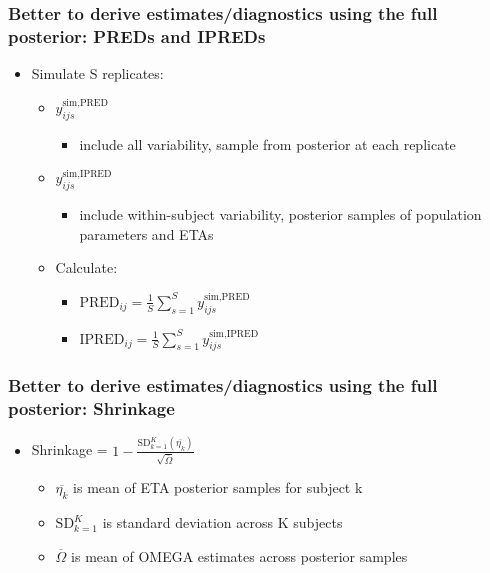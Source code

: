 \documentclass{beamer}
\begin{document}
\begin{frame}
  \frametitle{Better to derive estimates/diagnostics using the full posterior: PREDs and IPREDs}

\begin{itemize}
  \item<1-> Simulate S replicates:
        \begin{itemize}
          \item<2-> $y_{ijs}^{\text{sim,PRED}}$
                \begin{itemize}
                  \item include all variability, sample from posterior at each replicate
                \end{itemize}
          \item<3-> $y_{ijs}^{\text{sim,IPRED}}$
                \begin{itemize}
                  \item include within-subject variability, posterior samples of population parameters and ETAs
                \end{itemize}
        \end{itemize}
        \begin{itemize}
          \item<4-> Calculate:
                \begin{itemize}
                  \item $\text{PRED}_{ij} = \frac{1}{S} \sum_{s=1}^{S} y_{ijs}^{\text{sim,PRED}}$
                  \item<5-> $\text{IPRED}_{ij} = \frac{1}{S} \sum_{s=1}^{S} y_{ijs}^{\text{sim,IPRED}}$
                \end{itemize}
        \end{itemize}
\end{itemize}

\end{frame}

\begin{frame}
  \frametitle{Better to derive estimates/diagnostics using the full posterior: Shrinkage}

\begin{itemize}
  \item Shrinkage = $1 - \frac{\text{SD}_{k=1}^K(\overline{\eta_k})}{\sqrt{\overline{\Omega}}}$
        \begin{itemize}
                \item $\overline{\eta_k}$ is mean of ETA posterior samples for subject k
                \item $\text{SD}_{k=1}^K$ is standard deviation across K subjects
                \item $\overline{\Omega}$ is mean of OMEGA estimates across posterior samples
        \end{itemize}
\end{itemize}

\end{frame}
\end{document}
